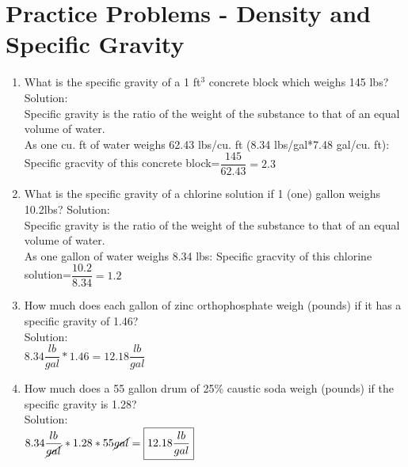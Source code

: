 \section*{Practice Problems - Density and Specific Gravity} 
\begin{enumerate}

\item What is the specific gravity of a 1 ft$^3$ concrete block which weighs 145 lbs?
Solution:\\
Specific gravity is the ratio of the weight of the substance to that of an equal volume of water.\\
As one cu. ft of water weighs 62.43 lbs/cu. ft (8.34 lbs/gal*7.48 gal/cu. ft):\\
Specific gracvity of this concrete block=$\dfrac{145}{62.43}=\boxed{2.3}$
\vspace{0.2cm}

\item What is the specific gravity of a chlorine solution if 1 (one) gallon weighs 10.2lbs?
Solution:\\
\vspace{0.2cm}
Specific gravity is the ratio of the weight of the substance to that of an equal volume of water.\\
As one gallon of water weighs 8.34 lbs: Specific gracvity of this chlorine solution=$\dfrac{10.2}{8.34}=\boxed{1.2}$
\vspace{0.2cm}




\item How much does each gallon of zinc orthophosphate weigh (pounds) if it has a specific gravity of 1.46?\\
\vspace{0.2cm}
Solution:\\
\vspace{0.2cm}
$8.34\dfrac{lb}{gal}*1.46=\boxed{12.18\dfrac{lb}{gal}}$
\vspace{0.2cm}
\item How much does a 55 gallon drum of 25\% caustic soda weigh (pounds) if the specific gravity is 1.28?\\
\vspace{0.2cm}
Solution:\\
\vspace{0.2cm}
$8.34\dfrac{lb}{\cancel{gal}}*1.28*55\cancel{gal}=\boxed{12.18\dfrac{lb}{gal}}$
\vspace{0.2cm}
\end{enumerate}


